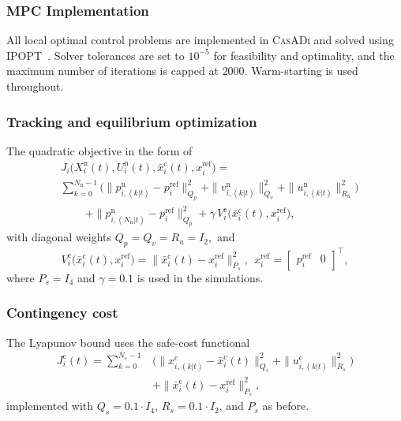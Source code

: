 \documentclass[twocolumn]{autart}
\begin{document}
\subsubsection{MPC Implementation}
All local optimal control problems are implemented in \textsc{CasADi} and solved using \textsc{IPOPT}~\cite{IPOPT}.
Solver tolerances are set to $10^{-5}$ for feasibility and optimality, and the maximum number of iterations is capped at $2000$.
Warm-starting is used throughout.
\label{subsec:mpc_impl}
\subsubsection*{Tracking and equilibrium optimization}
The quadratic objective in the form of 
\begin{align*}
&J_i\big(X_i^{\mathrm{n}}(t), U_i^{\mathrm{n}}(t), \bar{x}^{\mathrm{c}}_i(t), x_i^{\mathrm{ref}}\big)= \\ 
&\sum_{k=0}^{N_{\mathrm n}-1}
\Big(
\|p^{\mathrm n}_{i,(k|t)}-p_i^{\mathrm{ref}}\|_{Q_p}^2
+\|v^{\mathrm n}_{i,(k|t)}\|_{Q_v}^2
+\|u^{\mathrm n}_{i,(k|t)}\|_{R_u}^2
\Big) \\
& \qquad \ +\|p^{\mathrm n}_{i,(N_{\mathrm n}|t)}-p_i^{\mathrm{ref}}\|_{Q_p}^2 +\gamma\,V_i^{\mathrm{c}}\!\big(\bar{x}^{\mathrm{c}}_i(t), x_i^{\mathrm{ref}}\big),
\end{align*}
with diagonal weights
\(
Q_p = Q_v = R_u=I_2,
\)
and
\[
V_i^{\mathrm{c}}\!\big(\bar{x}^{\mathrm{c}}_i(t), x_i^{\mathrm{ref}}\big) =\|\bar x_i^{\mathrm c}(t)-x_i^{\mathrm{ref}}\|_{P_s}^2,\ \
x^{\mathrm{ref}}_i=\begin{bmatrix}p_i^{\mathrm{ref}}&0\end{bmatrix}^\top,
\]
where $P_s = I_4$ and $\gamma=0.1$ is used in the simulations.

\subsubsection*{Contingency cost}
The Lyapunov bound uses the safe-cost functional
\begin{align*}
J_i^{\mathrm c}(t)
=
\sum_{k=0}^{N_{\mathrm c}-1}&
\Big(
\|x^{\mathrm c}_{i,(k|t)}-\bar x_i^{\mathrm c}(t)\|_{Q_s}^2
+\|u^{\mathrm c}_{i,(k|t)}\|_{R_s}^2
\Big) \\
&+\|\bar x_i^{\mathrm c}(t)-x_i^{\mathrm{ref}}\|_{P_s}^2,
\end{align*}
implemented with $Q_s=0.1\cdot I_4$, $R_s= 0.1 \cdot I_2$, and $P_s$ as before.
\end{document}
